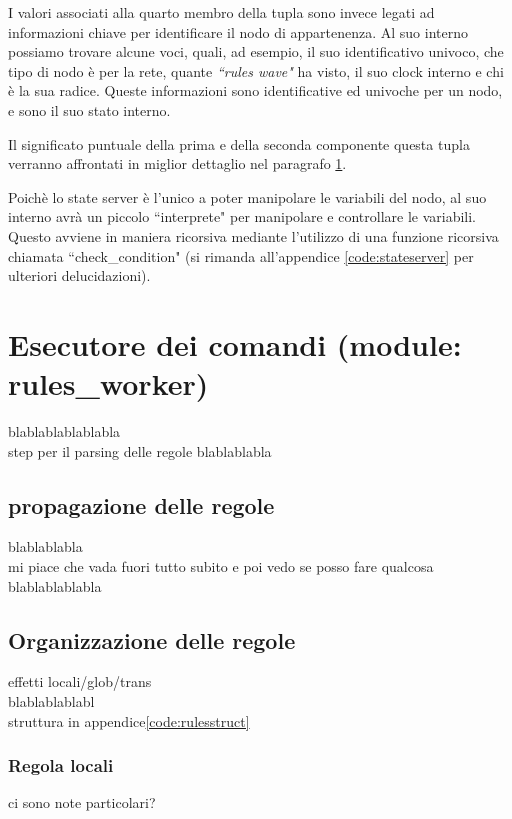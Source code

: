 \documentclass[italian]{memoir}
\begin{document}
I valori associati alla quarto membro della tupla sono invece legati ad informazioni chiave per identificare il nodo di appartenenza. Al suo interno possiamo trovare alcune voci, quali, ad esempio, il suo identificativo univoco, che tipo di nodo è per la rete, quante \textit{``rules wave"} ha visto, il suo clock interno e chi è la sua radice. Queste informazioni sono identificative ed univoche per un nodo, e sono il suo stato interno.

Il significato puntuale della prima e della seconda componente questa tupla verranno affrontati in miglior dettaglio nel paragrafo \ref{impl:rules_worker}. 

Poichè lo state server è l'unico a poter manipolare le variabili del nodo, al suo interno avrà un piccolo ``interprete" per manipolare e controllare le variabili. Questo avviene in maniera ricorsiva mediante l'utilizzo di una funzione ricorsiva chiamata ``check\_condition" (si rimanda all'appendice \ref{code:stateserver} per ulteriori delucidazioni).

\section{Esecutore dei comandi (module: rules\_worker)}\label{impl:rules_worker}

blablablablablabla\\
step per il parsing delle regole blablablabla

\subsection{propagazione delle regole}
blablablabla\\
mi piace che vada fuori tutto subito e poi vedo se posso fare qualcosa\\
blablablablabla

\subsection{Organizzazione delle regole}
effetti locali/glob/trans\\
blablablablabl\\
struttura in appendice\ref{code:rulesstruct}%

\subsubsection{Regola locali}
ci sono note particolari?
\end{document}
